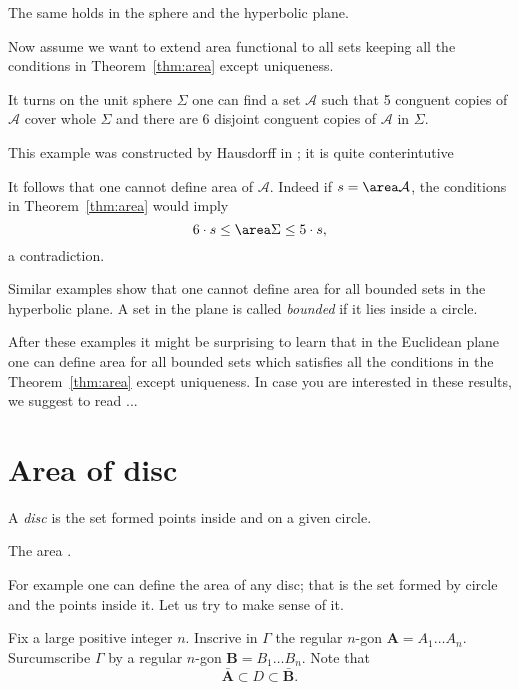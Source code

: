{The same holds in the sphere and the hyperbolic plane.


Now assume we want to extend area functional to all sets keeping all the 
conditions in Theorem~\ref{thm:area} except uniqueness.

It turns on the unit sphere $\Sigma$ one can find a set
$\mathcal{A}$ such that 5 conguent copies of $\mathcal{A}$
cover whole $\Sigma$ and there are 6 disjoint conguent copies of $\mathcal{A}$ in $\Sigma$.

This example was constructed by Hausdorff in \cite{hausdorff};
it is quite conterintutive 

It follows that one cannot define area of $\mathcal{A}$.
Indeed if $s=\area\mathcal{A}$,
the conditions in Theorem~\ref{thm:area} would imply 
\[6\cdot s\le \area \Sigma\le 5\cdot s,\]
a contradiction. 


Similar examples show that one cannot define area for all bounded sets in the hyperbolic plane.
A set in the plane is called \emph{bounded} if it lies inside a circle.

After these examples it might be surprising to learn that
in the Euclidean plane one can define area for all bounded sets
which satisfies all the conditions in the Theorem~\ref{thm:area} except uniqueness.
In case you are interested in these results, we suggest to read ...


















\section*{Area of disc}

A \emph{disc} is the set 
formed points inside and on a given circle.

The area .

For example one can define the area of any disc;
that is the set formed by circle and the points inside it.
Let us try to make sense of it.

Fix a large positive integer $n$.
Inscrive in $\Gamma$ the regular $n$-gon $\bm{A}=A_1\dots A_n$.
Surcumscribe $\Gamma$ by a regular $n$-gon $\bm{B}=B_1\dots B_n$.
Note that 
\[\bar{\bm{A}}\subset D\subset\bar{\bm{B}}.\]

}
